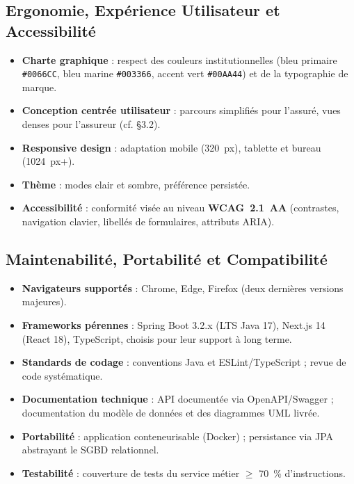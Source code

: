 \documentclass[11pt,a4paper]{article}
\begin{document}
\subsection{Ergonomie, Expérience Utilisateur et Accessibilité}
\begin{itemize}[leftmargin=1.4em]
  \item \textbf{Charte graphique} : respect des couleurs institutionnelles
  (bleu primaire \texttt{\#0066CC}, bleu marine \texttt{\#003366}, accent vert
  \texttt{\#00AA44}) et de la typographie de marque.
  \item \textbf{Conception centrée utilisateur} : parcours simplifiés pour l'assuré,
  vues denses pour l'assureur (cf. §3.2).
  \item \textbf{Responsive design} : adaptation mobile (320~px), tablette et bureau
  (1024~px+).
  \item \textbf{Thème} : modes clair et sombre, préférence persistée.
  \item \textbf{Accessibilité} : conformité visée au niveau \textbf{WCAG~2.1~AA}
  (contrastes, navigation clavier, libellés de formulaires, attributs ARIA).
\end{itemize}

\subsection{Maintenabilité, Portabilité et Compatibilité}
\begin{itemize}[leftmargin=1.4em]
  \item \textbf{Navigateurs supportés} : Chrome, Edge, Firefox (deux dernières versions
  majeures).
  \item \textbf{Frameworks pérennes} : Spring Boot 3.2.x (LTS Java 17), Next.js 14
  (React 18), TypeScript, choisis pour leur support à long terme.
  \item \textbf{Standards de codage} : conventions Java et ESLint/TypeScript ; revue de
  code systématique.
  \item \textbf{Documentation technique} : API documentée via OpenAPI/Swagger ;
  documentation du modèle de données et des diagrammes UML livrée.
  \item \textbf{Portabilité} : application conteneurisable (Docker) ; persistance via JPA
  abstrayant le SGBD relationnel.
  \item \textbf{Testabilité} : couverture de tests du service métier $\geq$ 70~\%
  d'instructions.
\end{itemize}
\end{document}
